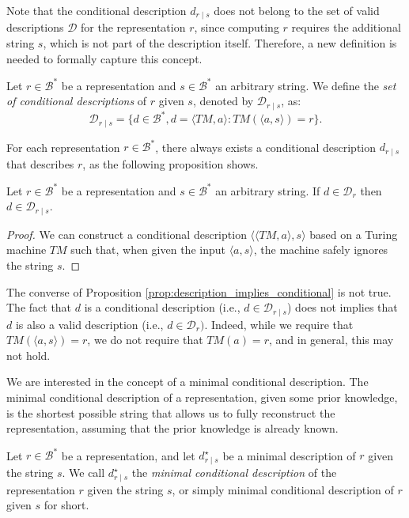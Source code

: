 Note that the conditional description $d_{r \mid s}$ does not belong to the set of valid descriptions $\mathcal{D}$ for the representation $r$, since computing $r$ requires the additional string $s$, which is not part of the description itself. Therefore, a new definition is needed to formally capture this concept.

\begin{definition}
Let $r \in \mathcal{B}^\ast$ be a representation and $s \in \mathcal{B}^\ast$ an arbitrary string. We define the \emph{set of conditional descriptions} of $r$ given $s$, denoted by $\mathcal{D}_{r \mid s}$, as:
\[
\mathcal{D}_{r \mid s} = \{ d \in \mathcal{B}^\ast, d = \langle TM, a \rangle : TM \left(\langle a, s \rangle \right) = r \}.
\]
\end{definition}

For each representation $r \in \mathcal{B}^\ast$, there always exists a conditional description $d_{r \mid s}$ that describes $r$, as the following proposition shows.

\begin{proposition}
\label{prop:description_implies_conditional}
Let $r \in \mathcal{B}^\ast$ be a representation and $s \in \mathcal{B}^\ast$ an arbitrary string. If $d \in \mathcal{D}_{r}$ then $d \in \mathcal{D}_{r \mid s}$.
\end{proposition}
\begin{proof}
We can construct a conditional description $\langle \langle TM, a \rangle, s \rangle$ based on a Turing machine $TM$ such that, when given the input $\langle a, s \rangle$, the machine safely ignores the string $s$.
\end{proof}

The converse of Proposition \ref{prop:description_implies_conditional} is not true. The fact that $d$ is a conditional description (i.e., $d \in \mathcal{D}_{r \mid s}$) does not implies that $d$ is also a valid description (i.e., $d \in \mathcal{D}_{r})$. Indeed, while we require that $TM \left(\langle a, s \rangle \right) = r$, we do not require that $TM(a) = r$, and in general, this may not hold.

We are interested in the concept of a minimal conditional description. The minimal conditional description of a representation, given some prior knowledge, is the shortest possible string that allows us to fully reconstruct the representation, assuming that the prior knowledge is already known.

\begin{definition}
Let $r \in \mathcal{B}^\ast$ be a representation, and let $d^\star_{r \mid s}$ be a minimal description of $r$ given the string $s$. We call $d^\star_{r \mid s}$ the \emph{minimal conditional description} of the representation $r$ given the string $s$, or simply minimal conditional description of $r$ given $s$ for short.
\end{definition}

